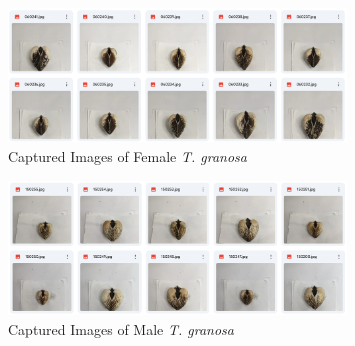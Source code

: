 \begin{figure}[!htbp]
	\centering
	\includegraphics[width=0.8\textwidth]{figures/female_dataset(img).png}
	\caption{Captured Images of Female \textit{T. granosa}}
\end{figure}

\begin{figure}[!htbp]
	\centering
	\includegraphics[width=0.8\textwidth]{figures/male_dataset(img).png}
	\caption{Captured Images of Male \textit{T. granosa}}
\end{figure}
